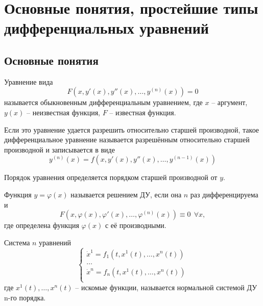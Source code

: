 




    \section{Основные понятия, простейшие типы дифференциальных уравнений}
    \subsection{Основные понятия}

    \begin{definition} 
        Уравнение вида \[F(x, y'(x), y''(x), \dots, y^{(n)}(x)) = 0\] называется обыкновенным дифференциальным уравнением,
        где $x$ -- аргумент, $y(x)$ -- неизвестная функция, $F$ -- известная функция.
    \end{definition}

    \begin{definition}
        Если это уравнение удается разрешить относительно старшей производной, такое дифференциальное
        уравнение называется разрешённым относительно старшей производной и записывается в виде
        \[y^{(n)}(x) = f(x, y'(x), y''(x), \dots, y^{(n-1)}(x))\]
    \end{definition}

    Порядок уравнения определяется порядком старшей производной от $y$.

    \begin{definition}
        Функция $y = \varphi(x)$ называется решением ДУ, если она $n$ раз дифференцируема и 
        \[F(x, \varphi(x), \varphi'(x), \dots, \varphi^{(n)}(x)) \equiv 0 ~~ \forall x,\]
        где определена функция $\varphi(x)$ с её производными.
    \end{definition}

    \begin{definition}
        Система $n$ уравнений
        \begin{equation}
            \begin{cases}
                \dot x^1 = f_1(t, x^1(t), \dots, x^n(t)) \\
                \dots \\
                \dot x^n = f_n(t, x^1(t), \dots, x^n(t)) \\
            \end{cases}
        \end{equation}
        где $x^1(t), \dots, x^n(t)$ -- искомые функции, называется нормальной системой ДУ n-го порядка.
    \end{definition}

